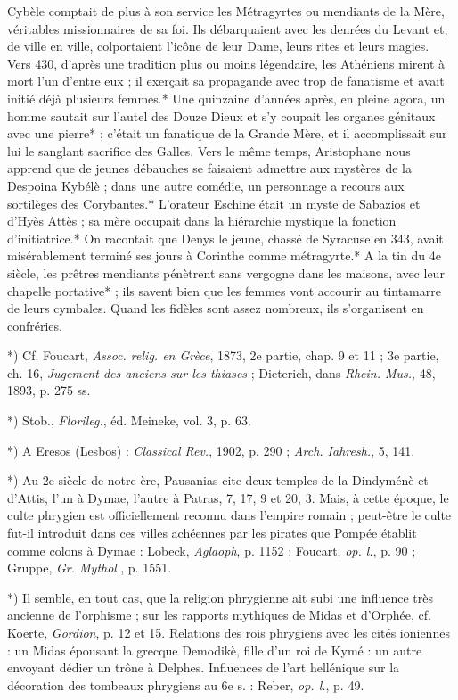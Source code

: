 \documentclass[a4paper, 11pt, oneside, polutonikogreek, french]{article}
\begin{document}
Cybèle comptait de plus à son service les Métragyrtes ou mendiants de la Mère, véritables missionnaires de sa foi. Ils débarquaient avec les denrées du Levant et, de ville en ville, colportaient l'icône de leur Dame, leurs rites et leurs magies. Vers 430, d'après une tradition plus ou moins légendaire, les Athéniens mirent à mort l'un d'entre eux ; il exerçait sa propagande avec trop de fanatisme et avait initié déjà plusieurs femmes.* Une quinzaine d'années après, en pleine agora, un homme sautait sur l'autel des Douze Dieux et s'y coupait les organes génitaux avec une pierre* ; c'était un fanatique de la Grande Mère, et il accomplissait sur lui le sanglant sacrifice des Galles. Vers le même temps, Aristophane nous apprend que de jeunes débauches se faisaient admettre aux mystères de la Despoina Kybélè ; dans une autre comédie, un personnage a recours aux sortilèges des Corybantes.* L'orateur Eschine était un myste de Sabazios et d'Hyès Attès ; sa mère occupait dans la hiérarchie mystique la fonction d'initiatrice.* On racontait que Denys le jeune, chassé de Syracuse en 343, avait misérablement terminé ses jours à Corinthe comme métragyrte.* A la tin du 4e siècle, les prêtres mendiants pénètrent sans vergogne dans les maisons, avec leur chapelle portative* ; ils savent bien que les femmes vont accourir au tintamarre de leurs cymbales. Quand les fidèles sont assez nombreux, ils s'organisent en confréries.

*) Cf. Foucart, \emph{Assoc. relig. en Grèce}, 1873, 2e partie, chap. 9 et 11 ; 3e partie, ch. 16, \emph{Jugement des anciens sur les thiases} ; Dieterich, dans \emph{Rhein. Mus.}, 48, 1893, p. 275 ss.

*) Stob., \emph{Florileg.}, éd. Meineke, vol. 3, p. 63.

*) A Eresos (Lesbos) : \emph{Classical Rev.}, 1902, p. 290 ; \emph{Arch. Iahresh.}, 5, 141.

*) Au 2e siècle de notre ère, Pausanias cite deux temples de la Dindyménè et d'Attis, l'un à Dymae, l'autre à Patras, 7, 17, 9 et 20, 3. Mais, à cette époque, le culte phrygien est officiellement reconnu dans l'empire romain ; peut-être le culte fut-il introduit dans ces villes achéennes par les pirates que Pompée établit comme colons à Dymae : Lobeck, \emph{Aglaoph}, p. 1152 ; Foucart, \emph{op. l.}, p. 90 ; Gruppe, \emph{Gr. Mythol.}, p. 1551.

*) Il semble, en tout cas, que la religion phrygienne ait subi une influence très ancienne de l'orphisme ; sur les rapports mythiques de Midas et d'Orphée, cf. Koerte, \emph{Gordion}, p. 12 et 15. Relations des rois phrygiens avec les cités ioniennes : un Midas épousant la grecque Demodikè, fille d'un roi de Kymé : un autre envoyant dédier un trône à Delphes. Influences de l'art hellénique sur la décoration des tombeaux phrygiens au 6e s. : Reber, \emph{op. l.}, p. 49.
\end{document}
